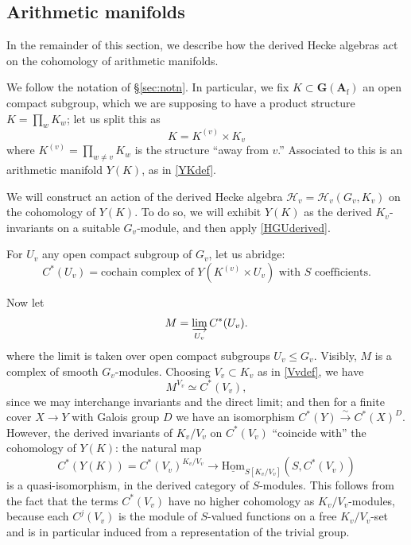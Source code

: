 \documentclass[10pt]{amsart}
\newcommand{\Afinite}{\mathbf{A}_{\mathrm{f}}}
\newcommand{\G}{\mathbf{G}}
\theoremstyle{remark}
\begin{document}
 




\subsection{Arithmetic manifolds} \label{Arithmeticmanifolds}

In the remainder of this section, we describe how the derived Hecke algebras act on the cohomology of arithmetic manifolds. 

We follow the notation of \S \ref{sec:notn}.  In particular, we fix
$K \subset \G(\Afinite)$ an open compact subgroup, 
which we are supposing to have a product structure $K = \prod_{w} K_w$;
let us split this as
$$ K =  K^{(v)} \times K_v$$ where $K^{(v)} = \prod_{w \neq v} K_w$ is the structure ``away from $v$.'' 
Associated to this is an arithmetic manifold $Y(K)$, as in \eqref{YKdef}. 

We will construct an action of the derived Hecke algebra $\mathscr{H}_v = \mathscr{H}_v(G_v, K_v)$   on the cohomology of $Y(K)$.
 To do so, we will exhibit $Y(K)$ as the derived $K_v$-invariants on a suitable $G_v$-module, and then apply \eqref{HGUderived}. 

For $U_v$ any open compact subgroup of $G_v$, let us abridge:
\begin{equation} \label{CUdef} C^*(U_v) = \mbox{cochain complex of  $Y(K^{(v)} \times U_v)$ with $S$ coefficients.}\end{equation}

Now let 
$$ M= \varinjlim_{U_v} C^* (U_v).$$ 
where the limit is taken over  open compact subgroups $U_v \leqslant G_v$. 
 Visibly, $M$ is a complex of smooth $G_v$-modules.  
 Choosing $V_v \subset K_v$ as in \eqref{Vvdef},    we have
$$M^{V_v} \simeq C^* (V_v),$$
since we may interchange  invariants and the direct limit; and then 
 for a finite cover $X \rightarrow Y$ with Galois group $D$
we have an isomorphism $C^*(Y) \stackrel{\sim}{\rightarrow} C^*(X)^{D}$. 
However, the   
 derived invariants of $K_v/V_v$ on $C^*(V_v)$
``coincide with'' the cohomology of $Y(K)$: the natural map
$$   C^*(Y(K)) =   C^*(V_v)^{K_v/V_v} \rightarrow  \underline{\mathrm{Hom}}_{S[K_v/V_v]}(S, C^*(V_v)) $$
is a quasi-isomorphism, in the derived category of $S$-modules. This follows from the fact that the terms
$C^*(V_v)$ have no higher cohomology as $K_v/V_v$-modules, because each $C^j(V_v)$  
  is the module of $S$-valued
 functions on a free $K_v/V_v$-set and is in particular induced from a representation of the trivial group. 
 
\end{document}
